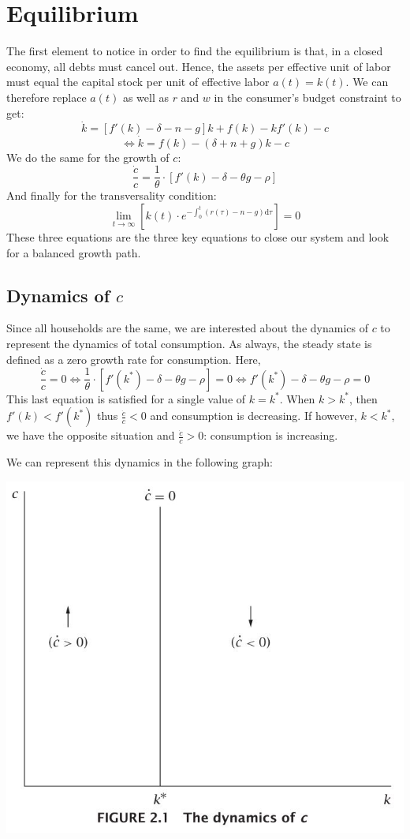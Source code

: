 \documentclass[12pt]{report}
\def\D{\mathrm{d}}
\begin{document}
\section{Equilibrium}

The first element to notice in order to find the equilibrium is that, in a closed economy, all debts must cancel out. Hence, the assets per effective unit of labor must equal the capital stock per unit of effective labor $a(t) = k(t)$. We can therefore replace $a(t)$ as well as $r$ and $w$ in the consumer's budget constraint to get: $$\dot k = [f'(k) - \delta - n - g]k + f(k) - kf'(k) - c $$ $$\Leftrightarrow \dot k = f(k) -(\delta + n + g)k - c$$ We do the same for the growth of $c$: $$\frac{\dot c}{c} = \frac{1}{\theta}\cdot [f'(k) - \delta - \theta g - \rho] $$
And finally for the transversality condition: $$\lim_{t\to\infty}[k(t)\cdot e^{-\int_{0}^{t}(r(\tau) - n -g)\D\tau}] = 0 $$
These three equations are the three key equations to close our system and look for a balanced growth path.

\subsection{Dynamics of $c$}

Since all households are the same, we are interested about the dynamics of $c$ to represent the dynamics of total consumption. As always, the steady state is defined as a zero growth rate for consumption. Here, $$\frac{\dot c}{c} = 0 \Leftrightarrow \frac{1}{\theta}\cdot [f'(k^*) - \delta - \theta g - \rho] = 0 \Leftrightarrow f'(k^*) - \delta - \theta g - \rho = 0 $$ This last equation is satisfied for a single value of $k = k^*$. When $k > k^*$, then $f'(k)<f'(k^*)$ thus $\frac{\dot c}{c} < 0$ and consumption is decreasing. If however, $k < k^*$, we have the opposite situation and $\frac{\dot c}{c} > 0$: consumption is increasing. 

We can represent this dynamics in the following graph:\begin{center}
\includegraphics[scale=0.75]{images/cdynamics}
\end{center}
\end{document}
